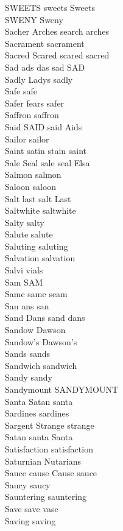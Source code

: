 SWEETS sweets Sweets\\
SWENY Sweny\\
Sacher Arches search arches\\
Sacrament sacrament\\
Sacred Scared scared sacred\\
Sad ads das sad SAD\\
Sadly Ladys sadly\\
Safe safe\\
Safer fears safer\\
Saffron saffron\\
Said SAID said Aids\\
Sailor sailor\\
Saint satin stain saint\\
Sale Seal sale seal Elsa\\
Salmon salmon\\
Saloon saloon\\
Salt last salt Last\\
Saltwhite saltwhite\\
Salty salty\\
Salute salute\\
Saluting saluting\\
Salvation salvation\\
Salvi vials\\
Sam SAM\\
Same same seam\\
San ans san\\
Sand Dans sand dans\\
Sandow Dawson\\
Sandow's Dawson's\\
Sands sands\\
Sandwich sandwich\\
Sandy sandy\\
Sandymount SANDYMOUNT\\
Santa Satan santa\\
Sardines sardines\\
Sargent Strange strange\\
Satan santa Santa\\
Satisfaction satisfaction\\
Saturnian Nutarians\\
Sauce cause Cause sauce\\
Saucy saucy\\
Sauntering sauntering\\
Save save vase\\
Saving saving\\
